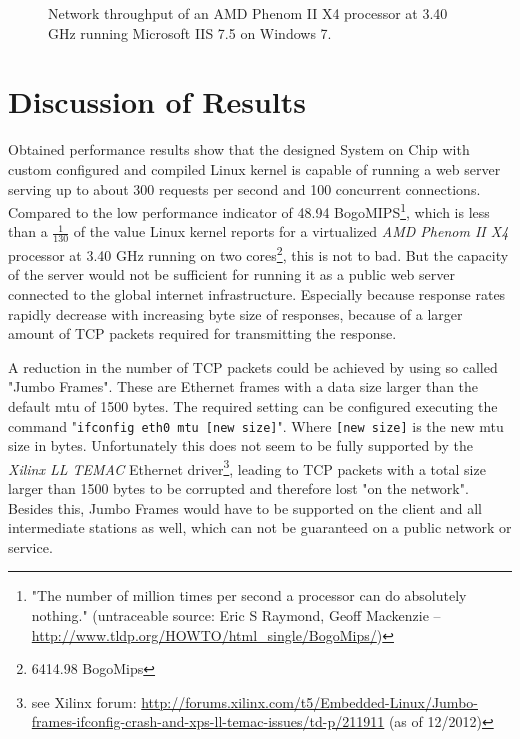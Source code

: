 \begin{figure}[H]
	\centering
  \caption{Network throughput of an AMD Phenom II X4 processor at 3.40 GHz running Microsoft IIS 7.5 on Windows 7.}
  \label{fig:tcp-io-perf-iis}
\end{figure}

\section{Discussion of Results}

Obtained performance results show that the designed System on Chip with custom configured and compiled Linux kernel is capable of running a web server serving up to about 300 requests per second and 100 concurrent connections. Compared to the low performance indicator of 48.94 BogoMIPS\footnote{"The number of million times per second a processor can do absolutely nothing." (untraceable source: Eric S Raymond, Geoff Mackenzie -- \url{http://www.tldp.org/HOWTO/html\_single/BogoMips/})}, which is less than a $\frac{1}{130}$ of the value Linux kernel reports for a virtualized \textit{AMD Phenom II X4} processor at 3.40 GHz running on two cores\footnote{6414.98 BogoMips}, this is not to bad. But the capacity of the server would not be sufficient for running it as a public web server connected to the global internet infrastructure. Especially because response rates rapidly decrease with increasing byte size of responses, because of a larger amount of TCP packets required for transmitting the response.

A reduction in the number of TCP packets could be achieved by using so called "Jumbo Frames". These are Ethernet frames with a data size larger than the default \gls{mtu} of 1500 bytes. The required setting can be configured executing the command "\texttt{ifconfig eth0 mtu [new size]}". Where \texttt{[new size]} is the new \gls{mtu} size in bytes. Unfortunately this does not seem to be fully supported by the \textit{Xilinx LL TEMAC} Ethernet driver\footnote{see Xilinx forum: \url{http://forums.xilinx.com/t5/Embedded-Linux/Jumbo-frames-ifconfig-crash-and-xps-ll-temac-issues/td-p/211911} (as of 12/2012)}, leading to TCP packets with a total size larger than 1500 bytes to be corrupted and therefore lost "on the network". Besides this, Jumbo Frames would have to be supported on the client and all intermediate stations as well, which can not be guaranteed on a public network or service.

